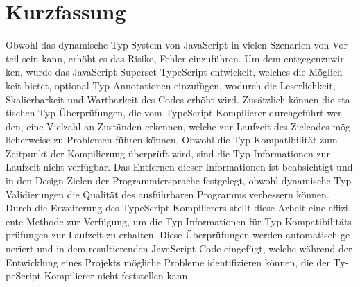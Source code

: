 \chapter{Kurzfassung}

\begin{german}
Obwohl das dynamische Typ-System von JavaScript in vielen Szenarien von Vorteil sein kann, erhöht es das Risiko, Fehler einzuführen. Um dem entgegenzuwirken, wurde das JavaScript-Superset TypeScript entwickelt, welches die Möglichkeit bietet, optional Typ-Annotationen einzufügen, wodurch die Leserlichkeit, Skalierbarkeit und Wartbarkeit des Codes erhöht wird. Zusätzlich können die statischen Typ-Überprüfungen, die vom TypeScript-Kompilierer durchgeführt werden, eine Vielzahl an Zuständen erkennen, welche zur Laufzeit des Zielcodes möglicherweise zu Problemen führen können. Obwohl die Typ-Kompatibilität zum Zeitpunkt der Kompilierung überprüft wird, sind die Typ-Informationen zur Laufzeit nicht verfügbar. Das Entfernen dieser Informationen ist beabsichtigt und in den Design-Zielen der Programmiersprache festgelegt, obwohl dynamische Typ-Validierungen die Qualität des ausführbaren Programms verbessern können. Durch die Erweiterung des TypeScript-Kompilierers stellt diese Arbeit eine effiziente Methode zur Verfügung, um die Typ-Informationen für Typ-Kompatibilitätsprüfungen zur Laufzeit zu erhalten. Diese Überprüfungen werden automatisch generiert und in dem resultierenden JavaScript-Code eingefügt, welche während der Entwicklung eines Projekts mögliche Probleme identifizieren können, die der TypeScript-Kompilierer nicht feststellen kann.
\end{german}
